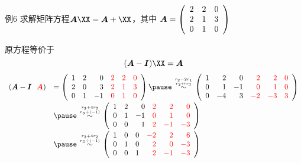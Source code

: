 \begin{frame}
\begin{footnotesize}
  \begin{exampleblock}{例6}
    求解矩阵方程$\A\XX=\A+\XX$，其中
    $
    \boldsymbol{A} = \left(
    \begin{array}{ccc}
      2&2&0\\
      2&1&3\\
      0&1&0
    \end{array}
    \right)
    $
  \end{exampleblock}
  \pause
  \jiename 原方程等价于
  $$
  (\A-\II)\XX=\A
  $$
  \pause
  $$
  \begin{array}{ll}
    (\A-\II ~~\red{\A})& =\left(
    \begin{array}{rrrrrr}
      1&2& 0&\red{2}&\red{2}&\red{0}\\
      2&0& 3&\red{2}&\red{1}&\red{3}\\
      0&1&-1&\red{0}&\red{1}&\red{0}
    \end{array}
    \right)
    \pause
    \overset{r_2-2r_1\atop r_2\leftrightarrow r_3}{\sim}
    \left(
    \begin{array}{rrrrrr}
      1& 2& 0&\red{ 2}&\red{ 2}&\red{0}\\
      0& 1&-1&\red{ 0}&\red{ 1}&\red{0}\\
      0&-4& 3&\red{-2}&\red{-3}&\red{3}
    \end{array}
    \right)    \\[0.2in]
    &\pause
    \overset{r_3+4r_2\atop r_3\div(-1)}{\sim}
    \left(
    \begin{array}{rrrrrr}
      1&2& 0&\red{2}&\red{ 2}&\red{ 0}\\
      0&1&-1&\red{0}&\red{ 1}&\red{ 0}\\
      0&0& 1&\red{2}&\red{-1}&\red{-3}
    \end{array}
    \right) \\[0.2in]
    & \pause 
    \overset{r_3+4r_2\atop r_3\div(-1)}{\sim}
    \left(
    \begin{array}{rrrrrr}
      1&0&0&\red{-2}&\red{2}&\red{6}\\
      0&1&0&\red{2}&\red{0}&\red{-3}\\
      0&0&1&\red{2}&\red{-1}&\red{-3}
    \end{array}
    \right)
  \end{array}
  $$
\end{footnotesize}  
\end{frame}

